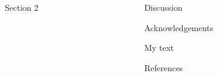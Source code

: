 \documentclass[t, final, 32pt]{beamer}
\begin{document}
\begin{frame}{}
\begin{columns}[t]
\begin{column}{.31\linewidth}
\begin{block}{Section 2}
  \blindtext
\end{block}
\end{column}


\begin{column}{.31\linewidth}
\begin{block}{Discussion}

  \blindtext
\end{block}

\begin{block}{Acknowledgements}

  My text

  \blinditemize
\end{block}

\begin{block}{References}

  \blinditemize
\end{block}
\end{column}
\end{columns}

\end{frame}
\end{document}
